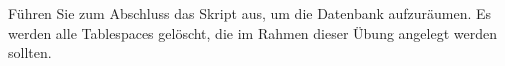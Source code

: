     \item F\"uhren Sie zum Abschluss das Skript  aus, um die Datenbank aufzur\"aumen. Es werden alle Tablespaces gel\"oscht, die im Rahmen dieser \"Ubung angelegt werden sollten.
